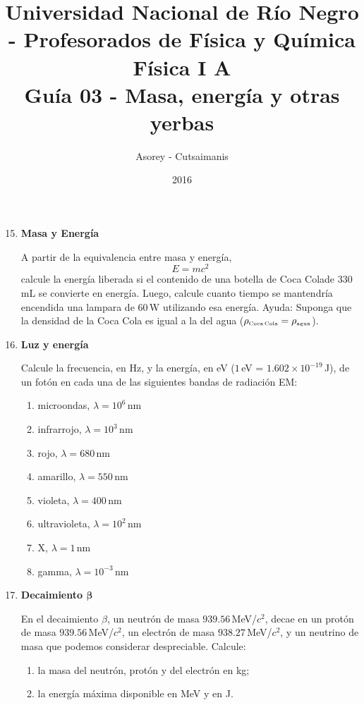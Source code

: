 \documentclass[a4paper,12pt]{article}
\begin{document}
\title{
{\normalsize{Universidad Nacional de Río Negro - Profesorados de Física y Química}}\\
Física I A \\ Guía 03 - Masa, energía y otras yerbas}
\author{Asorey - Cutsaimanis}
\date{2016}
\maketitle

\begin{enumerate}
\setcounter{enumi}{14}      %

\item {\bf{Masa y Energía}}

A partir de la equivalencia entre masa y energía, 
\begin{equation}
E = m c^2
\end{equation} 
calcule la energía liberada si el contenido de una botella de Coca
Cola\texttrademark de $330$\,mL se convierte en energía. Luego, calcule cuanto
tiempo se mantendría encendida una lampara de $60$\,W utilizando esa energía.
Ayuda: Suponga que la densidad de la Coca Cola es igual a la del agua
($\rho_{\textrm{\tiny{Coca\,Cola}}}={\rho_{\textrm{\tiny{agua}}}}$).

\item {\bf{Luz y energía}}

Calcule la frecuencia, en Hz, y la energía, en eV ($1$\,eV =
$1.602\times10^{-19}$\,J), de un fotón en cada una de las siguientes bandas de
radiación EM:
\begin{enumerate}
\item microondas, $\lambda=10^6$\,nm
\item infrarrojo, $\lambda=10^3$\,nm
\item rojo, $\lambda=680$\,nm
\item amarillo, $\lambda=550$\,nm
\item violeta, $\lambda=400$\,nm
\item ultravioleta, $\lambda=10^2$\,nm
\item X, $\lambda=1$\,nm
\item gamma, $\lambda=10^{-3}$\,nm
\end{enumerate}

\item {\bf{Decaimiento $\mathbf{\beta}$}}

En el decaimiento $\beta$, un neutrón de masa $939.56$\,MeV/$c^2$, decae en un
protón de masa $939.56$\,MeV/$c^2$, un electrón de masa $938.27$\,MeV/$c^2$, y
un neutrino de masa que podemos considerar despreciable. Calcule:
\begin{enumerate}
\item la masa del neutrón, protón y del electrón en kg;
\item la energía máxima disponible en MeV y en J.
\end{enumerate}


\end{enumerate}
\end{document}

